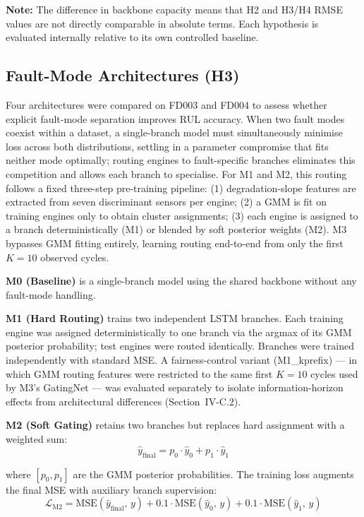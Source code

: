 \documentclass[review,12pt]{elsarticle}
\begin{document}
\textbf{Note:} The difference in backbone capacity means that H2 and H3/H4 RMSE values are not directly comparable in absolute terms. Each hypothesis is evaluated internally relative to its own controlled baseline.

\subsection{Fault-Mode Architectures (H3)}

Four architectures were compared on FD003 and FD004 to assess whether explicit fault-mode separation improves RUL accuracy. When two fault modes coexist within a dataset, a single-branch model must simultaneously minimise loss across both distributions, settling in a parameter compromise that fits neither mode optimally; routing engines to fault-specific branches eliminates this competition and allows each branch to specialise. For M1 and M2, this routing follows a fixed three-step pre-training pipeline: (1) degradation-slope features are extracted from seven discriminant sensors per engine; (2) a GMM is fit on training engines only to obtain cluster assignments; (3) each engine is assigned to a branch deterministically (M1) or blended by soft posterior weights (M2). M3 bypasses GMM fitting entirely, learning routing end-to-end from only the first $K = 10$ observed cycles.

\textbf{M0 (Baseline)} is a single-branch model using the shared backbone without any fault-mode handling.

\textbf{M1 (Hard Routing)} trains two independent LSTM branches. Each training engine was assigned deterministically to one branch via the argmax of its GMM posterior probability; test engines were routed identically. Branches were trained independently with standard MSE. A fairness-control variant (M1\_kprefix) --- in which GMM routing features were restricted to the same first $K = 10$ cycles used by M3's GatingNet --- was evaluated separately to isolate information-horizon effects from architectural differences (Section~IV-C.2).

\textbf{M2 (Soft Gating)} retains two branches but replaces hard assignment with a weighted sum:
\begin{equation}
\hat{y}_{\text{final}} = p_0 \cdot \hat{y}_0 + p_1 \cdot \hat{y}_1
\end{equation}

where $[p_0, p_1]$ are the GMM posterior probabilities. The training loss augments the final MSE with auxiliary branch supervision:
\begin{equation}
\mathcal{L}_{\text{M2}} = \text{MSE}(\hat{y}_{\text{final}},\, y) + 0.1\cdot\text{MSE}(\hat{y}_0,\, y) + 0.1\cdot\text{MSE}(\hat{y}_1,\, y)
\end{equation}
\end{document}

